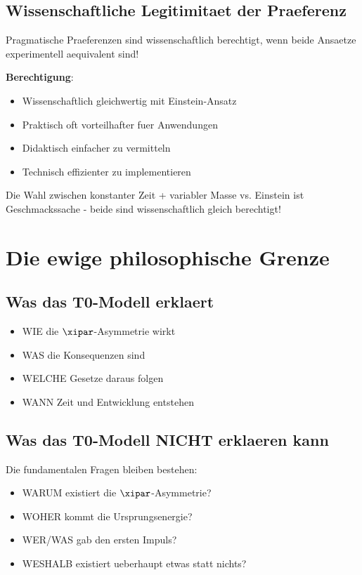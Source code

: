 	\subsection{Wissenschaftliche Legitimitaet der Praeferenz}
	
	\begin{tcolorbox}[colback=green!5!white,colframe=green!75!black,title=Wichtige Erkenntnis]
		Pragmatische Praeferenzen sind wissenschaftlich berechtigt, wenn beide Ansaetze experimentell aequivalent sind!
	\end{tcolorbox}
	
	\textbf{Berechtigung}:
	\begin{itemize}
		\item Wissenschaftlich gleichwertig mit Einstein-Ansatz
		\item Praktisch oft vorteilhafter fuer Anwendungen
		\item Didaktisch einfacher zu vermitteln
		\item Technisch effizienter zu implementieren
	\end{itemize}
	
	Die Wahl zwischen konstanter Zeit + variabler Masse vs. Einstein ist Geschmackssache - beide sind wissenschaftlich gleich berechtigt!
	
	\section{Die ewige philosophische Grenze}
	
	\subsection{Was das T0-Modell erklaert}
	
	\begin{itemize}
		\item WIE die $\xipar$-Asymmetrie wirkt
		\item WAS die Konsequenzen sind
		\item WELCHE Gesetze daraus folgen
		\item WANN Zeit und Entwicklung entstehen
	\end{itemize}
	
	\subsection{Was das T0-Modell NICHT erklaeren kann}
	
	Die fundamentalen Fragen bleiben bestehen:
	\begin{itemize}
		\item WARUM existiert die $\xipar$-Asymmetrie?
		\item WOHER kommt die Ursprungsenergie?
		\item WER/WAS gab den ersten Impuls?
		\item WESHALB existiert ueberhaupt etwas statt nichts?
	\end{itemize}
	

